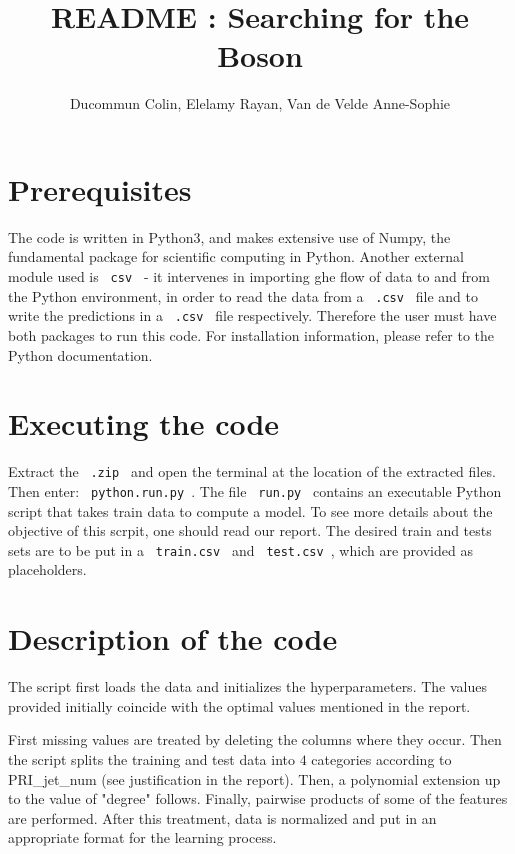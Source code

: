 \documentclass[11pt, oneside]{article}   	%
\title{README : Searching for the Boson}
\author{Ducommun Colin, Elelamy Rayan, Van de Velde Anne-Sophie}
\date{}
\begin{document}
\maketitle

\section{Prerequisites}

The code is written in Python3, and makes extensive use of Numpy, the fundamental package for scientific computing in Python. Another external module used is \lstinline" csv " - it intervenes in importing ghe flow of data to and from the Python environment, in order to read the data from a \lstinline" .csv " file and to write the predictions in a \lstinline" .csv " file respectively. Therefore the user must have both packages to run this code. For installation information, please refer to the Python documentation. 

\section{Executing the code}

Extract the \lstinline" .zip " and open the terminal at the location of the extracted files. Then enter: \lstinline" python.run.py ". The file \lstinline" run.py " contains an executable Python script that takes train data to compute a model. To see more details about the objective of this scrpit, one should read our report. The desired train and tests sets are to be put in a \lstinline" train.csv " and \lstinline" test.csv ", which are provided as placeholders. 

\section{Description of the code}

The script first loads the data and initializes the hyperparameters. The values provided initially coincide with the optimal values mentioned in the report. 

First missing values are treated by deleting the columns where they occur. Then the script splits the training and test data into $4$ categories according to PRI\_jet\_num (see justification in the report). Then, a polynomial extension up to the value of "degree" follows. Finally, pairwise products of some of the features are performed. After this treatment, data is normalized and put in an appropriate format for the learning process.
\end{document}
